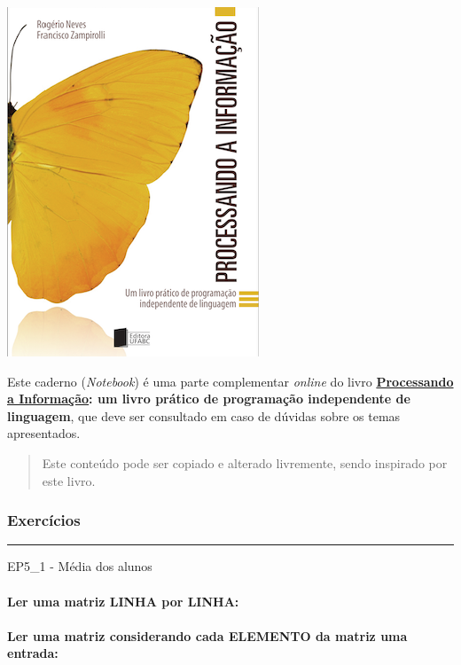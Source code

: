 \documentclass[12pt,a4paper]{article}
\renewcommand{\linethickness}{0.05em}
\begin{document}
    \includegraphics{"figs/Capa_Processando_Informacao.jpg"}

Este caderno (\emph{Notebook}) é uma parte complementar \emph{online} do
livro
\textbf{\href{https://editora.ufabc.edu.br/matematica-e-ciencias-da-computacao/58-processando-a-informacao}{Processando
a Informação}: um livro prático de programação independente de
linguagem}, que deve ser consultado em caso de dúvidas sobre os temas
apresentados.

\begin{quote}
Este conteúdo pode ser copiado e alterado livremente, sendo inspirado
por este livro.
\end{quote}

    \hypertarget{exercuxedcios}{%
\subsubsection{Exercícios}\label{exercuxedcios}}

    \begin{center}\rule{0.5\linewidth}{\linethickness}\end{center}

EP5\_1 - Média dos alunos

    \hypertarget{ler-uma-matriz-linha-por-linha}{%
\paragraph{Ler uma matriz LINHA por
LINHA:}\label{ler-uma-matriz-linha-por-linha}}

    \hypertarget{ler-uma-matriz-considerando-cada-elemento-da-matriz-uma-entrada}{%
\paragraph{Ler uma matriz considerando cada ELEMENTO da matriz uma
entrada:}\label{ler-uma-matriz-considerando-cada-elemento-da-matriz-uma-entrada}}
\end{document}
